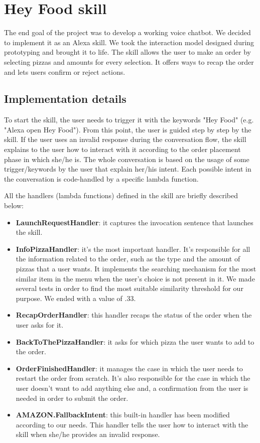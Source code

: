 \section{Hey Food skill}
The end goal of the project was to develop a working voice chatbot.
We decided to implement it as an Alexa skill. We took the interaction model designed during prototyping and brought it to life. The skill allows the user to make an order by selecting pizzas and amounts for every selection. It offers ways to recap the order and lets users confirm or reject actions.

\subsection{Implementation details}

To start the skill, the user needs to trigger it with the keywords "Hey Food" (e.g. "Alexa open Hey Food").
From this point, the user is guided step by step by the skill. If the user uses an invalid response during the conversation flow, the skill explains to the user how to interact with it according to the order placement phase in which she/he is.
The whole conversation is based on the usage of some trigger/keywords by the user that explain her/his intent. Each possible intent in the conversation is code-handled by a specific lambda function. 

All the handlers (lambda functions) defined in the skill are briefly described below:

\begin{itemize}

    \item \textbf{LaunchRequestHandler}: it captures the invocation sentence that launches the skill.
    \item \textbf{InfoPizzaHandler}: it's the most important handler. It's responsible for all the information related to the order, such as the type and the amount of pizzas that a user wants. It implements the searching mechanism for the most similar item in the menu when the user's choice is not present in it. We made several tests in order to find the most suitable similarity threshold for our purpose. We ended with a value of .33.
    \item \textbf{RecapOrderHandler}: this handler recaps the status of the order when the user asks for it.
    \item \textbf{BackToThePizzaHandler}: it asks for which pizza the user wants to add to the order.
    \item \textbf{OrderFinishedHandler}: it manages the case in which the user needs to restart the order from scratch. It's also responsible for the case in which the user doesn't want to add anything else and, a confirmation from the user is needed in order to submit the order.
    \item \textbf{AMAZON.FallbackIntent}: this built-in handler has been modified according to our needs. This handler tells the user how to interact with the skill when she/he provides an invalid response.
    
\end{itemize}
